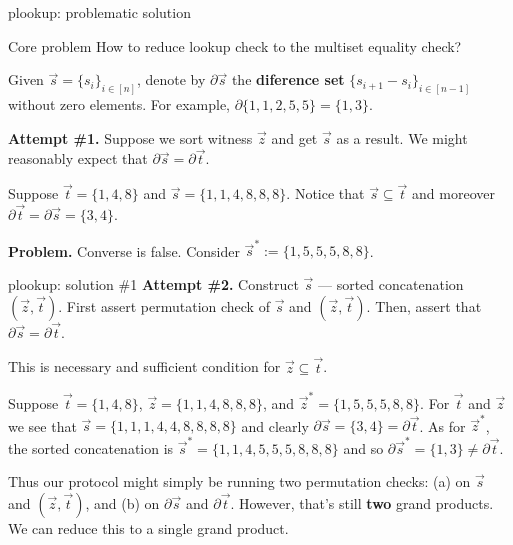 \documentclass{zkdl-presentation-template}
\begin{document}
    \begin{frame}{plookup: problematic solution}
        \begin{block}{Core problem}
            How to reduce lookup check to the multiset equality check?\pause
        \end{block}

        \begin{definition}
            Given $\vec{s} = \{s_i\}_{i \in [n]}$, denote by $\partial\vec{s}$
            the \textbf{diference set} $\{s_{i+1}-s_i\}_{i \in [n-1]}$ without
            zero elements. For example, $\partial\{1,1,2,5,5\} = \{1,3\}$.\pause
        \end{definition}

        \textbf{Attempt \#1.} Suppose we sort witness $\vec{z}$ and get
        $\vec{s}$ as a result. We might reasonably expect that $\partial\vec{s}
        = \partial\vec{t}$.\pause
        \begin{example}
            Suppose $\vec{t}=\{1,4,8\}$ and $\vec{s} = \{1,1,4,8,8,8\}$. Notice
            that $\vec{s} \subseteq \vec{t}$ and moreover $\partial\vec{t} =
            \partial\vec{s} = \{3,4\}$.\pause
        \end{example}

        \textcolor{red!70!black}{\textbf{Problem.}} Converse is false. Consider $\vec{s}^*:=\{1,5,5,5,8,8\}$.
    \end{frame}

    \begin{frame}{plookup: solution \#1}
        \textbf{Attempt \#2.} Construct $\vec{s}$ --- sorted concatenation
        $(\vec{z},\vec{t})$. First assert permutation check of $\vec{s}$ and
        $(\vec{z},\vec{t})$. Then, assert that $\partial\vec{s} =
        \partial\vec{t}$.\pause
        
        \begin{lemma}
            This is necessary and sufficient condition for $\vec{z} \subseteq
            \vec{t}$.\pause
        \end{lemma}

        \begin{example}
            Suppose $\vec{t} = \{1,4,8\}$, $\vec{z} = \{1,1,4,8,8,8\}$, and
            $\vec{z}^*=\{1,5,5,5,8,8\}$. For $\vec{t}$ and $\vec{z}$ we see that
            $\vec{s} = \{1,1,1,4,4,8,8,8,8\}$ and clearly $\partial\vec{s} =
            \{3,4\} = \partial\vec{t}$. As for $\vec{z}^*$, the sorted
            concatenation is $\vec{s}^*=\{1,1,4,5,5,5,8,8,8\}$ and so
            $\partial\vec{s}^*=\{1,3\} \neq \partial\vec{t}$.\pause
        \end{example}

        Thus our protocol might simply be running two permutation checks: (a) on
        $\vec{s}$ and $(\vec{z},\vec{t})$, and (b) on $\partial\vec{s}$ and
        $\partial\vec{t}$. However, that's still \textbf{two} grand products. We
        can reduce this to a single grand product.
    \end{frame}
\end{document}
